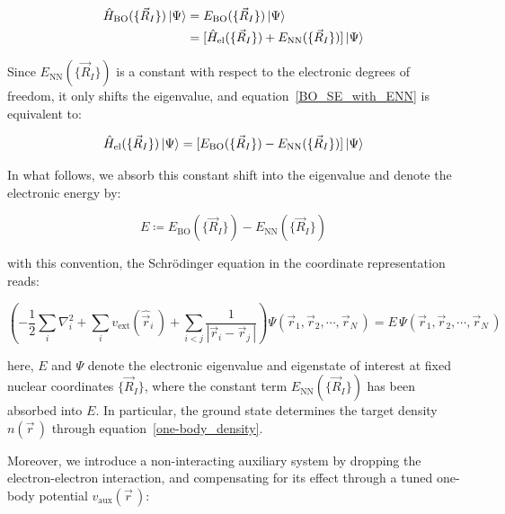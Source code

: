 \begin{equation}
\begin{aligned}
    \hat{H}_\mathrm{BO}(\{\vec{R}_I\})\ket{\Psi}
    &= E_\mathrm{BO}(\{\vec{R}_I\})\ket{\Psi} \\
    &= [\hat{H}_\mathrm{el}(\{\vec{R}_I\}) + E_\mathrm{NN}(\{\vec{R}_I\})]\ket{\Psi}
\end{aligned}
\label{BO_SE_with_ENN}
\end{equation}

Since $E_\mathrm{NN}(\{\vec{R}_I\})$ is a constant with respect to the electronic degrees of freedom, it only shifts the eigenvalue, and equation~\eqref{BO_SE_with_ENN} is equivalent to:

\begin{equation}
    \hat{H}_\mathrm{el}(\{\vec{R}_I\})\ket{\Psi}
    = [E_\mathrm{BO}(\{\vec{R}_I\}) - E_\mathrm{NN}(\{\vec{R}_I\})]\ket{\Psi}
\label{BO_SE_shift_ENN}
\end{equation}

In what follows, we absorb this constant shift into the eigenvalue and denote the electronic energy by:

\begin{equation}
    E\coloneqq E_\mathrm{BO}(\{\vec{R}_I\})-E_\mathrm{NN}(\{\vec{R}_I\})
\label{absorbed_electronic_energy}
\end{equation}

with this convention, the Schrödinger equation in the coordinate representation reads:

\begin{equation}
    \left(-\frac{1}{2}\sum_i\nabla_i^2
    + \sum_i v_{\mathrm{ext}}(\hat{\vec{r}}_i\,)
    + \sum_{i<j}\frac{1}{|\vec{r}_i - \vec{r}_j\,|}\right)\Psi(\vec{r}_1,\vec{r}_2,\cdots,\vec{r}_N\,)= E\,\Psi(\vec{r}_1,\vec{r}_2,\cdots,\vec{r}_N\,)
\label{BO_hamiltonian_SE}
\end{equation}

here, $E$ and $\Psi$ denote the electronic eigenvalue and eigenstate of interest at fixed nuclear coordinates $\{\vec{R}_I\}$,
where the constant term $E_\mathrm{NN}(\{\vec{R}_I\})$ has been absorbed into $E$.
In particular, the ground state determines the target density $n(\vec{r}\,)$ through equation~\eqref{one-body_density}.

Moreover, we introduce a non-interacting auxiliary system by dropping the electron-electron interaction,
and compensating for its effect through a tuned one-body potential $v_\mathrm{aux}(\vec{r}\,)$:

